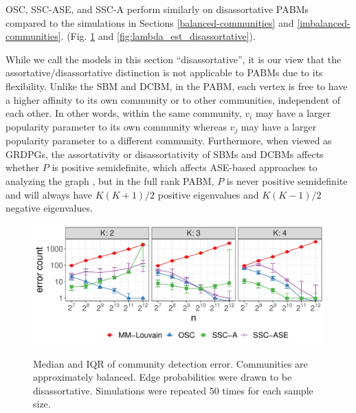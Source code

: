 \documentclass[12pt]{article}
\begin{document}
OSC, SSC-ASE, and SSC-A perform similarly on disassortative PABMs compared to the simulations in Sections \ref{balanced-communities} and \ref{imbalanced-communities}. 
(Fig. \ref{fig:clust_k_disassortative} and \ref{fig:lambda_est_disassortative}).

\begin{remark}
While we call the models in this section ``disassortative'', it is our view that the assortative/disassortative distinction is not applicable to PABMs due to its flexibility. 
Unlike the SBM and DCBM, in the PABM, each vertex is free to have a higher affinity to its own community or to other communities, independent of each other. 
In other words, within the same community, $v_i$ may have a larger popularity parameter to its own community whereas $v_j$ may have a larger popularity parameter to a different community. 
Furthermore, when viewed as GRDPGs, the assortativity or disassortativity of SBMs and DCBMs affects whether $P$ is positive semidefinite, which affects ASE-based approaches to analyzing the graph \citep{rubindelanchy2017statistical}, 
but in the full rank PABM, $P$ is never positive semidefinite and will always have $K (K + 1) / 2$ positive eigenvalues and $K (K - 1) / 2$ negative eigenvalues. 
\end{remark}

\begin{figure}[H]
{\centering \includegraphics{summary_files/figure-latex/clust_err_k_disassortative}
}
\caption{Median and IQR of community detection error. Communities are approximately balanced. 
Edge probabilities were drawn to be disassortative. 
Simulations were repeated 50 times for each sample size.}\label{fig:clust_k_disassortative}
\end{figure}
\end{document}
